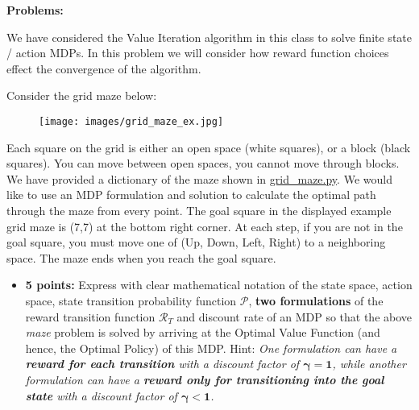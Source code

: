 \documentclass[12pt]{exam}
\begin{document}
 \newpage{}
{\large{\bf Problems:}}
\begin{questions}
 We have considered the Value Iteration algorithm in this class to solve finite state / action MDPs. In this problem we will consider how reward function choices effect the convergence of the algorithm.

Consider the grid maze below:

\begin{figure}[!htbp]
\centering
\texttt{[image: images/grid\_maze\_ex.jpg]}
\end{figure}

Each square on the grid is either an open space (white squares), or a block (black squares). You can move between open spaces, you cannot move through blocks. We have provided a dictionary of the maze shown in \href{https://github.com/TikhonJelvis/RL-book/blob/master/rl/problems/Midterm-Winter2021/grid_maze.py}{grid\_maze.py}. We would like to use an MDP formulation and solution to calculate the optimal path through the maze from every point. The goal square in the displayed example grid maze is (7,7) at the bottom right corner. At each step, if you are not in the goal square, you must move one of (Up, Down, Left, Right) to a neighboring space. The maze ends when you reach the goal square.

\begin{itemize}
\item {\bf 5 points:} Express with clear mathematical notation of the state space, action space, state transition probability function $\mathcal{P}$, \textbf{two formulations} of the reward transition function $\mathcal{R}_T$ and discount rate of an MDP so that the above {\em maze} problem is solved by arriving at the Optimal Value Function (and hence, the Optimal Policy) of this MDP. Hint: {\em One formulation can have a \textbf{reward for each transition} with a discount factor of $\boldsymbol{\gamma = 1}$, while another formulation can have a \textbf{reward only for transitioning into the goal state} with a discount factor of $\boldsymbol{\gamma < 1}$.}


\end{itemize}
\end{questions}
\end{document}
